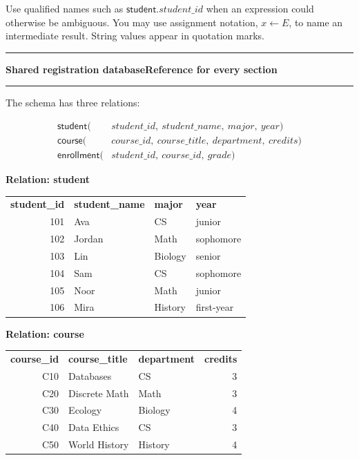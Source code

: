\documentclass[11pt]{article}
\newcommand{\sectionbar}[2]{%
  \vspace{4pt}%
  {\color{navy}\rule{\linewidth}{1.3pt}}\vspace{2pt}
  {\Large\bfseries #1}\hfill{\large\bfseries #2}\par
  {\color{navy}\rule{\linewidth}{0.5pt}}\vspace{3pt}
}
\newcommand{\student}{\mathsf{student}}
\newcommand{\course}{\mathsf{course}}
\newcommand{\enrollment}{\mathsf{enrollment}}
\begin{document}
Use qualified names such as $\student.\mathit{student\_id}$ when an expression could otherwise be ambiguous. You may use assignment notation, $x\leftarrow E$, to name an intermediate result. String values appear in quotation marks.

\newpage
\sectionbar{Shared registration database}{Reference for every section}

The schema has three relations:

\begin{align*}
\student(&\mathit{student\_id},\ \mathit{student\_name},\ \mathit{major},\ \mathit{year})\\
\course(&\mathit{course\_id},\ \mathit{course\_title},\ \mathit{department},\ \mathit{credits})\\
\enrollment(&\mathit{student\_id},\ \mathit{course\_id},\ \mathit{grade})
\end{align*}

\begin{minipage}[t]{0.49\linewidth}
\textbf{Relation: student}

\small\setlength{\tabcolsep}{3.5pt}
\begin{tabular}{@{}rlll@{}}
\rowcolor{navy}\color{white}\textbf{student\_id} & \color{white}\textbf{student\_name} & \color{white}\textbf{major} & \color{white}\textbf{year} \\
101 & Ava & CS & junior \\
102 & Jordan & Math & sophomore \\
103 & Lin & Biology & senior \\
104 & Sam & CS & sophomore \\
105 & Noor & Math & junior \\
106 & Mira & History & first-year \\
\end{tabular}
\end{minipage}\hfill
\begin{minipage}[t]{0.49\linewidth}
\textbf{Relation: course}

\small\setlength{\tabcolsep}{3.5pt}
\begin{tabular}{@{}rllr@{}}
\rowcolor{navy}\color{white}\textbf{course\_id} & \color{white}\textbf{course\_title} & \color{white}\textbf{department} & \color{white}\textbf{credits} \\
C10 & Databases & CS & 3 \\
C20 & Discrete Math & Math & 3 \\
C30 & Ecology & Biology & 4 \\
C40 & Data Ethics & CS & 3 \\
C50 & World History & History & 4 \\
\end{tabular}
\end{minipage}
\end{document}
